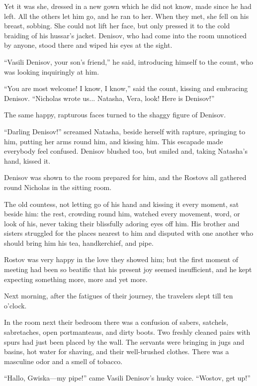 Yet it was she, dressed in a new gown which he did not know, made
since he had left. All the others let him go, and he ran to
her. When they met, she fell on his breast, sobbing. She could
not lift her face, but only pressed it to the cold braiding of
his hussar's jacket. Denisov, who had come into the room
unnoticed by anyone, stood there and wiped his eyes at the sight.

``Vasili Denisov, your son's friend,'' he said, introducing
himself to the count, who was looking inquiringly at him.

``You are most welcome! I know, I know,'' said the count, kissing
and embracing Denisov. ``Nicholas wrote us... Natasha, Vera,
look! Here is Denisov!''

The same happy, rapturous faces turned to the shaggy figure of
Denisov.

``Darling Denisov!'' screamed Natasha, beside herself with
rapture, springing to him, putting her arms round him, and
kissing him. This escapade made everybody feel confused. Denisov
blushed too, but smiled and, taking Natasha's hand, kissed it.

Denisov was shown to the room prepared for him, and the Rostovs
all gathered round Nicholas in the sitting room.

The old countess, not letting go of his hand and kissing it every
moment, sat beside him: the rest, crowding round him, watched
every movement, word, or look of his, never taking their
blissfully adoring eyes off him. His brother and sisters
struggled for the places nearest to him and disputed with one
another who should bring him his tea, handkerchief, and pipe.

Rostov was very happy in the love they showed him; but the first
moment of meeting had been so beatific that his present joy
seemed insufficient, and he kept expecting something more, more
and yet more.

Next morning, after the fatigues of their journey, the travelers
slept till ten o'clock.

In the room next their bedroom there was a confusion of sabers,
satchels, sabretaches, open portmanteaus, and dirty boots. Two
freshly cleaned pairs with spurs had just been placed by the
wall. The servants were bringing in jugs and basins, hot water
for shaving, and their well-brushed clothes. There was a
masculine odor and a smell of tobacco.

``Hallo, Gwiska---my pipe!'' came Vasili Denisov's husky
voice. ``Wostov, get up!''


